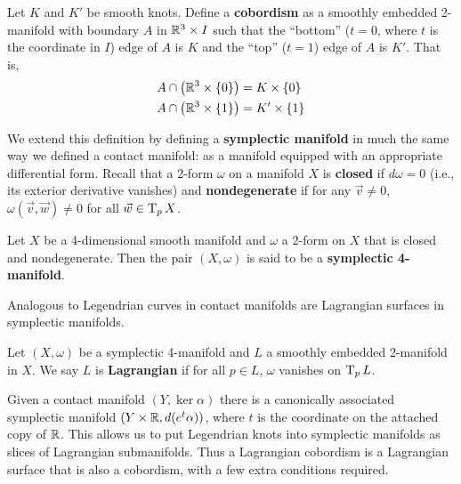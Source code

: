 \begin{definition}
    Let $K$ and $K'$ be smooth knots. Define a \textbf{cobordism} as a smoothly embedded 2-manifold with boundary $A$ in $\mathbb{R}^3 \times I$ such that the ``bottom'' ($t = 0$, where $t$ is the coordinate in $I$) edge of $A$ is $K$ and the ``top'' ($t=1$) edge of $A$ is $K'$. That is,
    \begin{align*}
        A \cap \left(\mathbb{R}^3 \times \{0\}\right) &= K \times \{0\}\\
        A \cap \left(\mathbb{R}^3 \times \{1\}\right) &= K' \times \{1\}
    \end{align*}
\end{definition}

We extend this definition by defining a \textbf{symplectic manifold} in much the same way we defined a contact manifold: as a manifold equipped with an appropriate differential form. Recall that a 2-form $\omega$ on a manifold $X$ is \textbf{closed} if $d \omega = 0$ (i.e., its exterior derivative vanishes) and \textbf{nondegenerate} if for any $\vec v \neq 0$, ${\omega(\vec v, \vec w) \neq 0}$ for all ${\vec w \in \operatorname{T}_p X}$.

\begin{definition}
    Let $X$ be a 4-dimensional smooth manifold and $\omega$ a 2-form on $X$ that is closed and nondegenerate. Then the pair $(X, \omega)$ is said to be a \textbf{symplectic 4-manifold}.
\end{definition}

Analogous to Legendrian curves in contact manifolds are Lagrangian surfaces in symplectic manifolds.
\begin{definition}
    Let $(X, \omega)$ be a symplectic 4-manifold and $L$ a smoothly embedded 2-manifold in $X$. We say $L$ is \textbf{Lagrangian} if for all $p \in L$, $\omega$ vanishes on $\operatorname{T}_p L$.
\end{definition}

Given a contact manifold $(Y, \ker \alpha)$ there is a canonically associated symplectic manifold $(Y \times \mathbb{R}, d(e^t \alpha))$, where $t$ is the coordinate on the attached copy of $\mathbb{R}$. This allows us to put Legendrian knots into symplectic manifolds as slices of Lagrangian submanifolds. Thus a Lagrangian cobordism is a Lagrangian surface that is also a cobordism, with a few extra conditions required.

